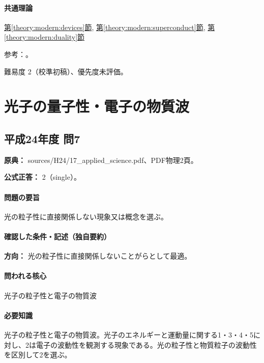 \paragraph{共通理論} \hyperref[theory:modern:devices]{第\ref*{theory:modern:devices}節}, \hyperref[theory:modern:superconduct]{第\ref*{theory:modern:superconduct}節}, \hyperref[theory:modern:duality]{第\ref*{theory:modern:duality}節}

\par 参考：\cite{modern_pv,modern_led,modern_laser,modern_oled,modern_superconduct,modern_pairs}。

\par 難易度 2（校準初稿）、優先度未評価。

\section{光子の量子性・電子の物質波}

\subsection{平成24年度 問7}
\label{q:h24-reg-applied-07}

\noindent\textbf{原典：} sources/H24/17\_applied\_science.pdf、PDF物理2頁。

\textbf{公式正答：} 2（single）。

\paragraph{問題の要旨} 光の粒子性に直接関係しない現象又は概念を選ぶ。

\paragraph{確認した条件・記述（独自要約）}\mbox{}\par

\noindent\textbf{方向：} 光の粒子性に直接関係しないことがらとして最適。\par

\paragraph{問われる核心} 光子の粒子性と電子の物質波

\paragraph{必要知識} 光子の粒子性と電子の物質波。光子のエネルギーと運動量に関する1・3・4・5に対し、2は電子の波動性を観測する現象である。光の粒子性と物質粒子の波動性を区別して2を選ぶ。

